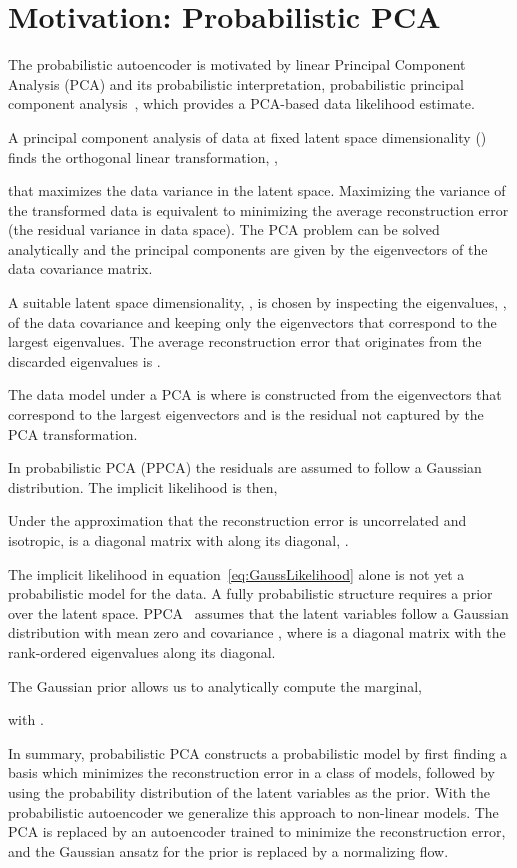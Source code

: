 \documentclass[10pt]{article} \usepackage[accepted]{tmlr}
\begin{document}
\section{Motivation: Probabilistic PCA}
\label{sec:PPCA}
The probabilistic autoencoder is motivated by linear Principal Component Analysis (PCA) and its probabilistic interpretation, probabilistic principal component analysis~\citep{TippingBishop1999}, which provides a PCA-based data likelihood estimate. 

A principal component analysis of data  at fixed latent space dimensionality  () finds the orthogonal linear transformation, ,

that maximizes the data variance in the latent space. Maximizing the variance of the transformed data is equivalent to minimizing the average reconstruction error (the residual variance in data space). The PCA problem can be solved analytically and the principal components are given by the eigenvectors of the data covariance matrix.

A suitable latent space dimensionality, , is chosen by inspecting the eigenvalues, , of the data covariance and keeping only the eigenvectors that correspond to the largest eigenvalues. The average reconstruction error that originates from the discarded eigenvalues is .

The data model under a PCA is
 where  is constructed from the eigenvectors that correspond to the largest eigenvectors and  is the residual not captured by the PCA transformation.


In probabilistic PCA (PPCA) the residuals are assumed to follow a Gaussian distribution. The implicit likelihood is then,

Under the approximation that the reconstruction error is uncorrelated and isotropic,  is a diagonal matrix with  along its diagonal, .  


The implicit likelihood in equation~\ref{eq:GaussLikelihood} alone is not yet a probabilistic model for the data. 
A fully probabilistic structure requires a prior over the latent space. 
PPCA~\citep{TippingBishop1999} assumes that the latent variables follow a Gaussian distribution with mean zero and covariance ,  where  is a diagonal matrix with the rank-ordered eigenvalues  along its diagonal. 

The Gaussian prior allows us to analytically compute the marginal,

with .

In summary, probabilistic PCA constructs a probabilistic model by first finding a basis which minimizes 
the reconstruction error in a class of models, followed by using the probability 
distribution of the latent variables as the prior. With the probabilistic autoencoder we generalize this 
approach to non-linear models. The PCA is replaced by an autoencoder trained to minimize the reconstruction error, and the Gaussian ansatz for the prior is replaced by a normalizing flow.
\end{document}
